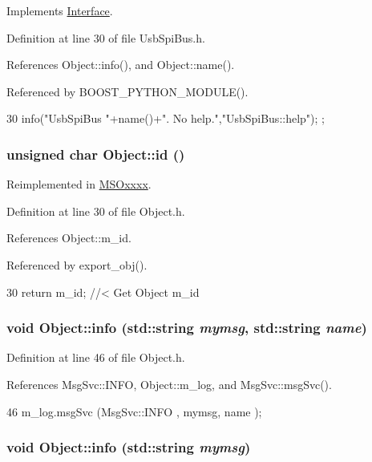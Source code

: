 Implements \hyperlink{classInterface_aedd3cf1d964c837e7848ccf81dc9c760}{Interface}.

Definition at line 30 of file UsbSpiBus.h.

References Object::info(), and Object::name().

Referenced by BOOST\_\-PYTHON\_\-MODULE().


\begin{DoxyCode}
30 { info("UsbSpiBus "+name()+". No help.","UsbSpiBus::help"); };
\end{DoxyCode}
\hypertarget{classObject_af99145335cc61ff6e2798ea17db009d2}{
\subsubsection[{id}]{\setlength{\rightskip}{0pt plus 5cm}unsigned char Object::id ()}}
\label{classObject_af99145335cc61ff6e2798ea17db009d2}


Reimplemented in \hyperlink{classMSOxxxx_a0f14b23d31d8e7647184e99a89600cc3}{MSOxxxx}.

Definition at line 30 of file Object.h.

References Object::m\_\-id.

Referenced by export\_\-obj().


\begin{DoxyCode}
30 { return m_id;         } //< Get Object m_id 
\end{DoxyCode}
\hypertarget{classObject_a1ca123253dfd30fc28b156f521dcbdae}{
\subsubsection[{info}]{\setlength{\rightskip}{0pt plus 5cm}void Object::info (std::string {\em mymsg}, \/  std::string {\em name})}}
\label{classObject_a1ca123253dfd30fc28b156f521dcbdae}


Definition at line 46 of file Object.h.

References MsgSvc::INFO, Object::m\_\-log, and MsgSvc::msgSvc().


\begin{DoxyCode}
46 { m_log.msgSvc (MsgSvc::INFO    , mymsg, name ); }
\end{DoxyCode}
\hypertarget{classObject_a644fd329ea4cb85f54fa6846484b84a8}{
\subsubsection[{info}]{\setlength{\rightskip}{0pt plus 5cm}void Object::info (std::string {\em mymsg})}}
\label{classObject_a644fd329ea4cb85f54fa6846484b84a8}


